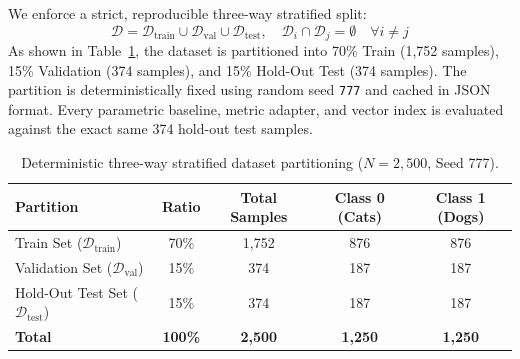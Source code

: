 \documentclass[sn-mathphys,Numbered]{sn-jnl}
\begin{document}
We enforce a strict, reproducible three-way stratified split:
\begin{equation}
\mathcal{D} = \mathcal{D}_{\text{train}} \cup \mathcal{D}_{\text{val}} \cup \mathcal{D}_{\text{test}}, \quad \mathcal{D}_i \cap \mathcal{D}_j = \emptyset \quad \forall i \ne j
\label{eq:partition_split}
\end{equation}
As shown in Table~\ref{tab:split}, the dataset is partitioned into 70\% Train (1,752 samples), 15\% Validation (374 samples), and 15\% Hold-Out Test (374 samples). The partition is deterministically fixed using random seed \texttt{777} and cached in JSON format. Every parametric baseline, metric adapter, and vector index is evaluated against the exact same 374 hold-out test samples.

\begin{table}[h]
\caption{Deterministic three-way stratified dataset partitioning ($N=2,500$, Seed 777).}
\label{tab:split}
\centering
\begin{tabular*}{\textwidth}{@{\extracolsep{\fill}}lcccc@{\extracolsep{\fill}}}
\toprule
Partition & Ratio & Total Samples & Class 0 (Cats) & Class 1 (Dogs) \\
\midrule
Train Set ($\mathcal{D}_{\text{train}}$) & 70\% & 1,752 & 876 & 876 \\
Validation Set ($\mathcal{D}_{\text{val}}$) & 15\% & 374 & 187 & 187 \\
Hold-Out Test Set ($\mathcal{D}_{\text{test}}$) & 15\% & 374 & 187 & 187 \\
\midrule
\textbf{Total} & \textbf{100\%} & \textbf{2,500} & \textbf{1,250} & \textbf{1,250} \\
\bottomrule
\end{tabular*}
\end{table}
\end{document}
